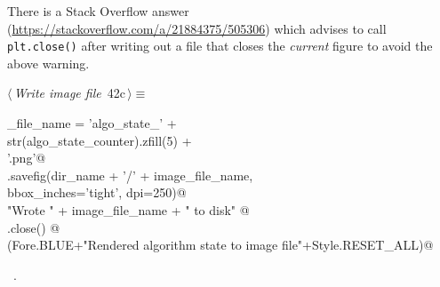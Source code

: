 \documentclass[11.5pt]{report}
\begin{document}
There is a  Stack Overflow answer (\url{https://stackoverflow.com/a/21884375/505306}) 
which advises to call \verb|plt.close()| after writing out a file that closes the 
\textit{current} figure to avoid the above warning. 
\begin{flushleft} \small\label{scrap59}\raggedright\small
{} $\langle\,${\itshape Write image file}\nobreak\ {\footnotesize {42c}}$\,\rangle\equiv$
\vspace{-1ex}
\begin{list}{}{} \item
\mbox{}\verb@image_file_name = 'algo_state_'                    +\@\\
\mbox{}\verb@                  str(algo_state_counter).zfill(5) +\@\\
\mbox{}\verb@                     '.png'@\\
\mbox{}\verb@plt.savefig(dir_name + '/' + image_file_name,  \@\\
\mbox{}\verb@            bbox_inches='tight', dpi=250)@\\
\mbox{}\verb@print "Wrote " + image_file_name + " to disk"   @\\
\mbox{}\verb@plt.close() @\\
\mbox{}\verb@debug(Fore.BLUE+"Rendered algorithm state to image file"+Style.RESET_ALL)@\\
\mbox{}\verb@@{\NWsep}
\end{list}
\vspace{-1.5ex}
\footnotesize
\begin{list}{}{\setlength{\itemsep}{-\parsep}\setlength{\itemindent}{-\leftmargin}}
\item \NWtxtMacroRefIn\ .

\item{}
\end{list}
\vspace{4ex}
\end{flushleft}
\end{document}
